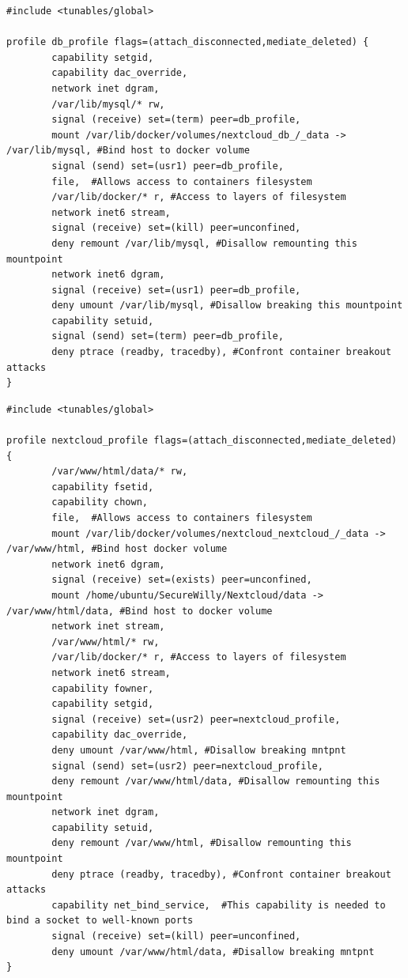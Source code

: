 \begin{lstlisting}[style=Dockerfile, caption={AppArmor profile for db service: db\_profile}]
#include <tunables/global>

profile db_profile flags=(attach_disconnected,mediate_deleted) {
        capability setgid,
        capability dac_override,
        network inet dgram,
        /var/lib/mysql/* rw,
        signal (receive) set=(term) peer=db_profile,
        mount /var/lib/docker/volumes/nextcloud_db_/_data -> /var/lib/mysql, #Bind host to docker volume
        signal (send) set=(usr1) peer=db_profile,
        file,  #Allows access to containers filesystem
        /var/lib/docker/* r, #Access to layers of filesystem
        network inet6 stream,
        signal (receive) set=(kill) peer=unconfined,
        deny remount /var/lib/mysql, #Disallow remounting this mountpoint
        network inet6 dgram,
        signal (receive) set=(usr1) peer=db_profile,
        deny umount /var/lib/mysql, #Disallow breaking this mountpoint
        capability setuid,
        signal (send) set=(term) peer=db_profile,
        deny ptrace (readby, tracedby), #Confront container breakout attacks
}
\end{lstlisting}

\begin{lstlisting}[style=Dockerfile, caption={AppArmor profile for nextcloud service: nextcloud\_profile}]
#include <tunables/global>

profile nextcloud_profile flags=(attach_disconnected,mediate_deleted) {
        /var/www/html/data/* rw,
        capability fsetid,
        capability chown,
        file,  #Allows access to containers filesystem
        mount /var/lib/docker/volumes/nextcloud_nextcloud_/_data -> /var/www/html, #Bind host docker volume
        network inet6 dgram,
        signal (receive) set=(exists) peer=unconfined,
        mount /home/ubuntu/SecureWilly/Nextcloud/data -> /var/www/html/data, #Bind host to docker volume
        network inet stream,
        /var/www/html/* rw,
        /var/lib/docker/* r, #Access to layers of filesystem
        network inet6 stream,
        capability fowner,
        capability setgid,
        signal (receive) set=(usr2) peer=nextcloud_profile,
        capability dac_override,
        deny umount /var/www/html, #Disallow breaking mntpnt
        signal (send) set=(usr2) peer=nextcloud_profile,
        deny remount /var/www/html/data, #Disallow remounting this mountpoint
        network inet dgram,
        capability setuid,
        deny remount /var/www/html, #Disallow remounting this mountpoint
        deny ptrace (readby, tracedby), #Confront container breakout attacks
        capability net_bind_service,  #This capability is needed to bind a socket to well-known ports
        signal (receive) set=(kill) peer=unconfined,
        deny umount /var/www/html/data, #Disallow breaking mntpnt
}
\end{lstlisting}

